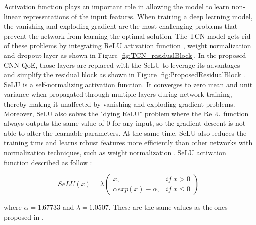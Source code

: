 Activation function plays an important role in allowing the model to learn non-linear representations of the input features.
When training a deep learning model, the vanishing and exploding gradient are the most challenging problems that prevent the network from learning the optimal solution.
The TCN model gets rid of these problems by integrating
ReLU activation function \cite{Network_Relu},
weight normalization \cite{Network_WeightNorm1} and dropout \cite{Network_Dropout1} layer as shown in Figure \ref{fig:TCN_residualBlock}.
In the proposed CNN-QoE, those layers are replaced with the SeLU to leverage its advantages and simplify the residual block as shown in Figure \ref{fig:ProposedResidualBlock}.
SeLU is a self-normalizing activation function.
It converges to zero mean and unit variance when propagated through multiple layers during network training, thereby making it unaffected by vanishing and exploding gradient problems.
Moreover, SeLU also solves the "dying ReLU" problem where the ReLU function always outputs the same value of 0 for any input, so the gradient descent is not able to alter the learnable parameters.
At the same time, SeLU also reduces the training time and learns robust features more efficiently than other networks with normalization techniques, such as weight normalization \cite{SeLU}.
SeLU activation function described as follow \cite{SeLU}:

\begin{equation}
\label{eq:SeLU}
  SeLU(x) = \lambda \begin{pmatrix}
    x, & \textit{if } x > 0 \\ 
    \alpha \textit{exp}(x) - \alpha, & \textit{if } x \leq 0 
  \end{pmatrix}
\end{equation}


where $\alpha = 1.67733$ and $\lambda = 1.0507$. These are the same values as the ones proposed in \cite{SeLU}.


